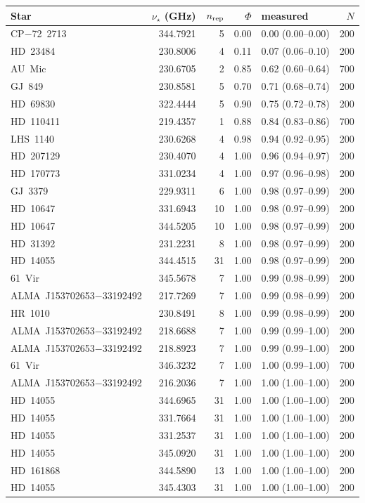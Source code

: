 \begin{tabular}{@{}l@{~~}r@{~~}r@{~~}r@{~~}l@{~~}r@{}}
\hline
Star & $\nu_\star$ (GHz) & $n_{\rm rep}$ & $\Phi$ & measured & $N$ \\
\hline
CP$-$72~2713 & 344.7921 & 5 & 0.00 & 0.00 (0.00--0.00) & 200 \\
HD~23484 & 230.8006 & 4 & 0.11 & 0.07 (0.06--0.10) & 200 \\
AU~Mic & 230.6705 & 2 & 0.85 & 0.62 (0.60--0.64) & 700 \\
GJ~849 & 230.8581 & 5 & 0.70 & 0.71 (0.68--0.74) & 200 \\
HD~69830 & 322.4444 & 5 & 0.90 & 0.75 (0.72--0.78) & 200 \\
HD~110411 & 219.4357 & 1 & 0.88 & 0.84 (0.83--0.86) & 700 \\
LHS~1140 & 230.6268 & 4 & 0.98 & 0.94 (0.92--0.95) & 200 \\
HD~207129 & 230.4070 & 4 & 1.00 & 0.96 (0.94--0.97) & 200 \\
HD~170773 & 331.0234 & 4 & 1.00 & 0.97 (0.96--0.98) & 200 \\
GJ~3379 & 229.9311 & 6 & 1.00 & 0.98 (0.97--0.99) & 200 \\
HD~10647 & 331.6943 & 10 & 1.00 & 0.98 (0.97--0.99) & 200 \\
HD~10647 & 344.5205 & 10 & 1.00 & 0.98 (0.97--0.99) & 200 \\
HD~31392 & 231.2231 & 8 & 1.00 & 0.98 (0.97--0.99) & 200 \\
HD~14055 & 344.4515 & 31 & 1.00 & 0.98 (0.97--0.99) & 200 \\
61~Vir & 345.5678 & 7 & 1.00 & 0.99 (0.98--0.99) & 200 \\
ALMA~J153702653$-$33192492 & 217.7269 & 7 & 1.00 & 0.99 (0.98--0.99) & 200 \\
HR~1010 & 230.8491 & 8 & 1.00 & 0.99 (0.98--0.99) & 200 \\
ALMA~J153702653$-$33192492 & 218.6688 & 7 & 1.00 & 0.99 (0.99--1.00) & 200 \\
ALMA~J153702653$-$33192492 & 218.8923 & 7 & 1.00 & 0.99 (0.99--1.00) & 200 \\
61~Vir & 346.3232 & 7 & 1.00 & 1.00 (0.99--1.00) & 700 \\
ALMA~J153702653$-$33192492 & 216.2036 & 7 & 1.00 & 1.00 (1.00--1.00) & 200 \\
HD~14055 & 344.6965 & 31 & 1.00 & 1.00 (1.00--1.00) & 200 \\
HD~14055 & 331.7664 & 31 & 1.00 & 1.00 (1.00--1.00) & 200 \\
HD~14055 & 331.2537 & 31 & 1.00 & 1.00 (1.00--1.00) & 200 \\
HD~14055 & 345.0920 & 31 & 1.00 & 1.00 (1.00--1.00) & 200 \\
HD~161868 & 344.5890 & 13 & 1.00 & 1.00 (1.00--1.00) & 200 \\
HD~14055 & 345.4303 & 31 & 1.00 & 1.00 (1.00--1.00) & 200 \\
\hline
\end{tabular}

